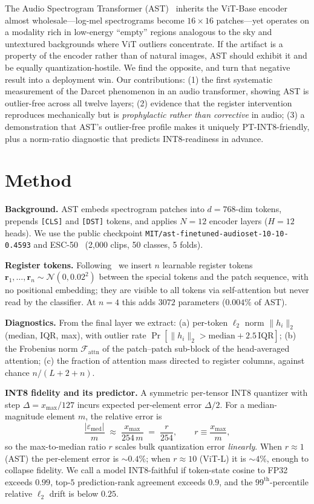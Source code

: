 \documentclass{article}
\begin{document}
The Audio Spectrogram Transformer (AST)~\cite{gong2021ast} inherits the ViT-Base encoder~\cite{dosovitskiy2021image} almost wholesale---log-mel spectrograms become $16\times16$ patches---yet operates on a modality rich in low-energy ``empty'' regions analogous to the sky and untextured backgrounds where ViT outliers concentrate. If the artifact is a property of the encoder rather than of natural images, AST should exhibit it and be equally quantization-hostile. We find the opposite, and turn that negative result into a deployment win. Our contributions: (1) the first systematic measurement of the Darcet phenomenon in an audio transformer, showing AST is outlier-free across all twelve layers; (2) evidence that the register intervention reproduces mechanically but is \emph{prophylactic rather than corrective} in audio; (3) a demonstration that AST's outlier-free profile makes it uniquely PT-INT8-friendly, plus a norm-ratio diagnostic that predicts INT8-readiness in advance.

\section{Method}
\textbf{Background.} AST embeds spectrogram patches into $d{=}768$-dim tokens, prepends \texttt{[CLS]} and \texttt{[DST]} tokens, and applies $N{=}12$ encoder layers ($H{=}12$ heads). We use the public checkpoint \texttt{MIT/ast-finetuned-audioset-10-10-0.4593} and ESC-50~\cite{piczak2015esc} (2{,}000 clips, 50 classes, 5 folds).

\textbf{Register tokens.} Following~\cite{darcet2024need} we insert $n$ learnable register tokens $\mathbf{r}_1,\ldots,\mathbf{r}_n\sim\mathcal{N}(0,0.02^2)$ between the special tokens and the patch sequence, with no positional embedding; they are visible to all tokens via self-attention but never read by the classifier. At $n{=}4$ this adds $3072$ parameters ($0.004\%$ of AST).

\textbf{Diagnostics.} From the final layer we extract: (a) per-token $\ell_2$ norm $\lVert h_i\rVert_2$ (median, IQR, max), with outlier rate $\Pr[\lVert h_i\rVert_2 > \mathrm{median}+2.5\,\mathrm{IQR}]$; (b) the Frobenius norm $\mathcal{F}_{\text{attn}}$ of the patch--patch sub-block of the head-averaged attention; (c) the fraction of attention mass directed to register columns, against chance $n/(L{+}2{+}n)$.

\textbf{INT8 fidelity and its predictor.} A symmetric per-tensor INT8 quantizer with step $\Delta = x_{\max}/127$ incurs expected per-element error $\Delta/2$. For a median-magnitude element $m$, the relative error is
\begin{equation}
\frac{|\varepsilon_{\text{med}}|}{m}\;\approx\;\frac{x_{\max}}{254\,m}\;=\;\frac{r}{254},
\qquad r \equiv \frac{x_{\max}}{m},
\label{eq:r}
\end{equation}
so the max-to-median ratio $r$ scales bulk quantization error \emph{linearly}. When $r\!\approx\!1$ (AST) the per-element error is $\sim\!0.4\%$; when $r\!\approx\!10$ (ViT-L) it is $\sim\!4\%$, enough to collapse fidelity. We call a model INT8-faithful if token-state cosine to FP32 exceeds $0.99$, top-$5$ prediction-rank agreement exceeds $0.9$, and the $99^{\text{th}}$-percentile relative $\ell_2$ drift is below $0.25$.
\end{document}
